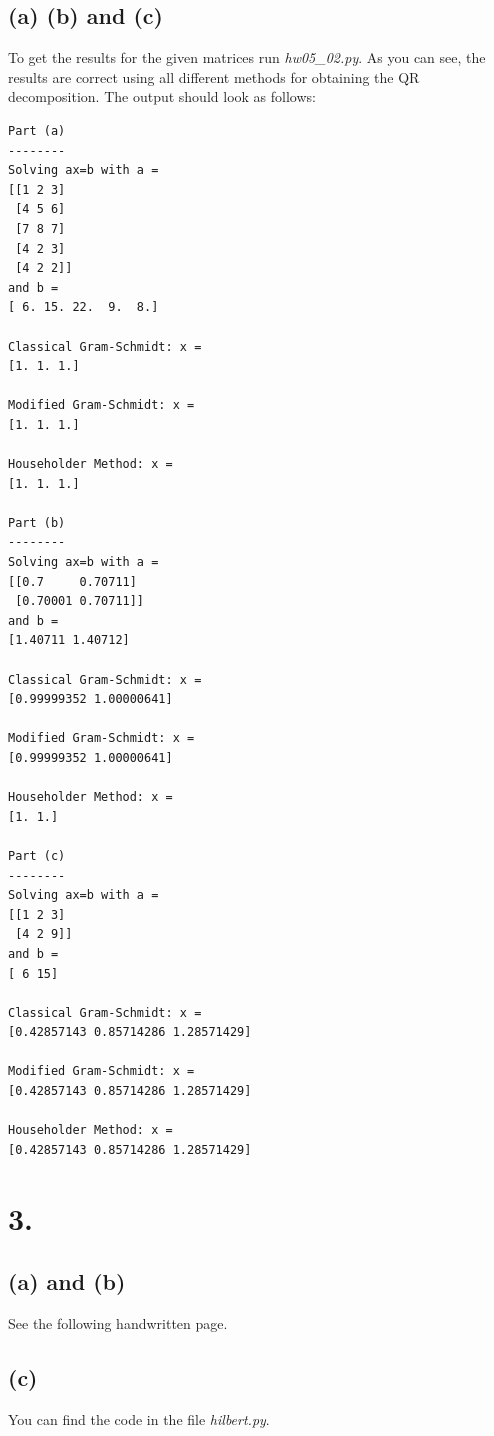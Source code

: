 \documentclass[a4paper, 11pt]{article}
\begin{document}
\subsection*{(a) (b) and (c)}
To get the results for the given matrices run \textit{hw05\_02.py}. As you can
see, the results are correct using all different methods for obtaining the QR
decomposition. The output should look as follows:

\begin{verbatim}
Part (a)
--------
Solving ax=b with a =
[[1 2 3]
 [4 5 6]
 [7 8 7]
 [4 2 3]
 [4 2 2]]
and b =
[ 6. 15. 22.  9.  8.]

Classical Gram-Schmidt: x =
[1. 1. 1.]

Modified Gram-Schmidt: x =
[1. 1. 1.]

Householder Method: x =
[1. 1. 1.]

Part (b)
--------
Solving ax=b with a =
[[0.7     0.70711]
 [0.70001 0.70711]]
and b =
[1.40711 1.40712]

Classical Gram-Schmidt: x =
[0.99999352 1.00000641]

Modified Gram-Schmidt: x =
[0.99999352 1.00000641]

Householder Method: x =
[1. 1.]

Part (c)
--------
Solving ax=b with a =
[[1 2 3]
 [4 2 9]]
and b =
[ 6 15]

Classical Gram-Schmidt: x =
[0.42857143 0.85714286 1.28571429]

Modified Gram-Schmidt: x =
[0.42857143 0.85714286 1.28571429]

Householder Method: x =
[0.42857143 0.85714286 1.28571429]
\end{verbatim}

\section*{3.}
\subsection*{(a) and (b)}
See the following handwritten page.


\newpage
\subsection*{(c)}
You can find the code in the file \textit{hilbert.py}.
\end{document}
